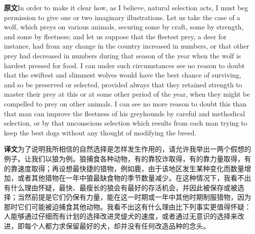 \documentclass[UTF8,zihao=-4]{ctexart}
\newcommand{\BodyFont}{\fontsize{10.5pt}{15.5pt}\selectfont}
\newcommand{\origlabel}{\textbf{原文}\quad}
\newcommand{\translabel}{\textbf{译文}\quad}
\newenvironment{enblock}{\par\noindent\begingroup\BodyFont\origlabel}{\par\endgroup}
\newenvironment{zhblock}{\par\noindent\begingroup\BodyFont\translabel}{\par\endgroup\vspace{0.35em}}
\newcommand{\pair}[2]{\begin{enblock}#1\end{enblock}\begin{zhblock}#2\end{zhblock}}
\begin{document}
\pair{In order to make it clear how, as I believe, natural selection acts, I must beg permission to give one or two imaginary illustrations. Let us take the case of a wolf, which preys on various animals, securing some by craft, some by strength, and some by fleetness; and let us suppose that the fleetest prey, a deer for instance, had from any change in the country increased in numbers, or that other prey had decreased in numbers during that season of the year when the wolf is hardest pressed for food. I can under such circumstances see no reason to doubt that the swiftest and slimmest wolves would have the best chance of surviving, and so be preserved or selected, provided always that they retained strength to master their prey at this or at some other period of the year, when they might be compelled to prey on other animals. I can see no more reason to doubt this than that man can improve the fleetness of his greyhounds by careful and methodical selection, or by that unconscious selection which results from each man trying to keep the best dogs without any thought of modifying the breed.}{为了说明我所相信的自然选择是怎样发生作用的，请允许我举出一两个假想的例子。让我们以狼为例。狼捕食各种动物，有的靠狡诈取得，有的靠力量取得，有的靠速度取得；再设想最快捷的猎物，例如鹿，由于该地区发生某种变化而数量增加，或者其他猎物在一年中狼最缺食物的季节数量减少。在这种情况下，我看不出有什么理由怀疑，最快、最瘦长的狼会有最好的存活机会，并因此被保存或被选择；当然前提是它们仍保有力量，能在这一时期或一年中其他时期制服猎物，因为那时它们可能被迫捕食其他动物。我看不出这有什么理由比下列事实更值得怀疑：人能够通过仔细而有计划的选择改进灵缇犬的速度，或者通过无意识的选择来改进，即每个人都力求保留最好的犬，却并没有任何改造品种的念头。}
\end{document}
